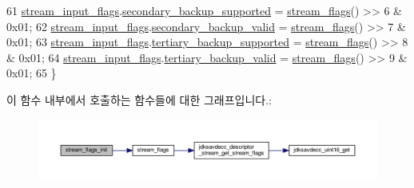 \begin{DoxyCode}
61     \hyperlink{classavdecc__lib_1_1stream__input__descriptor__response__imp_ae4c5137e195c92f8b8991d082ff48ee4}{stream\_input\_flags}.\hyperlink{structavdecc__lib_1_1stream__input__descriptor__response__imp_1_1stream__input__desc__stream__flags_a36275e9f64d4405dee0caebe993b7bf4}{secondary\_backup\_supported} = 
      \hyperlink{classavdecc__lib_1_1stream__input__descriptor__response__imp_ae2c7ef21d6748f8c665984ab3328f75f}{stream\_flags}() >> 6 & 0x01;
62     \hyperlink{classavdecc__lib_1_1stream__input__descriptor__response__imp_ae4c5137e195c92f8b8991d082ff48ee4}{stream\_input\_flags}.\hyperlink{structavdecc__lib_1_1stream__input__descriptor__response__imp_1_1stream__input__desc__stream__flags_ad57da73c72dd7cfbd155f90f283be4be}{secondary\_backup\_valid} = 
      \hyperlink{classavdecc__lib_1_1stream__input__descriptor__response__imp_ae2c7ef21d6748f8c665984ab3328f75f}{stream\_flags}() >> 7 & 0x01;
63     \hyperlink{classavdecc__lib_1_1stream__input__descriptor__response__imp_ae4c5137e195c92f8b8991d082ff48ee4}{stream\_input\_flags}.\hyperlink{structavdecc__lib_1_1stream__input__descriptor__response__imp_1_1stream__input__desc__stream__flags_abe8326a322f6549302ff36e93b6592b3}{tertiary\_backup\_supported} = 
      \hyperlink{classavdecc__lib_1_1stream__input__descriptor__response__imp_ae2c7ef21d6748f8c665984ab3328f75f}{stream\_flags}() >> 8 & 0x01;
64     \hyperlink{classavdecc__lib_1_1stream__input__descriptor__response__imp_ae4c5137e195c92f8b8991d082ff48ee4}{stream\_input\_flags}.\hyperlink{structavdecc__lib_1_1stream__input__descriptor__response__imp_1_1stream__input__desc__stream__flags_a7426502da296e440f798a0b55509e7e5}{tertiary\_backup\_valid} = 
      \hyperlink{classavdecc__lib_1_1stream__input__descriptor__response__imp_ae2c7ef21d6748f8c665984ab3328f75f}{stream\_flags}() >> 9 & 0x01;
65 \}
\end{DoxyCode}


이 함수 내부에서 호출하는 함수들에 대한 그래프입니다.\+:
\nopagebreak
\begin{figure}[H]
\begin{center}
\leavevmode
\includegraphics[width=350pt]{classavdecc__lib_1_1stream__input__descriptor__response__imp_a61edd2027d6d2e089f949076cc966006_cgraph}
\end{center}
\end{figure}




